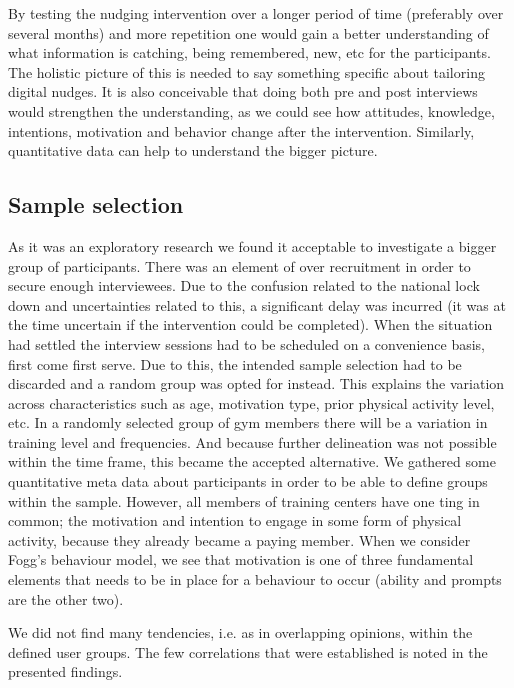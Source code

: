 By testing the nudging intervention over a longer period of time (preferably over several months) and more repetition one would gain a better understanding of what information is catching, being remembered, new, etc for the participants. The holistic picture of this is needed to say something specific about tailoring digital nudges. It is also conceivable that doing both pre and post interviews would strengthen the understanding, as we could see how attitudes, knowledge, intentions, motivation and behavior change after the intervention. Similarly, quantitative data can help to understand the bigger picture. 


\subsection{Sample selection}
As it was an exploratory research we found it acceptable to investigate a bigger group of participants. There was an element of over recruitment in order to secure enough interviewees. Due to the confusion related to the national lock down and uncertainties related to this, a significant delay was incurred (it was at the time uncertain if the intervention could be completed). When the situation had settled the interview sessions had to be scheduled on a convenience basis, first come first serve. Due to this, the intended sample selection had to be discarded and a random group was opted for instead. This explains the variation across characteristics such as age, motivation type, prior physical activity level, etc. In a randomly selected group of gym members there will be a variation in training level and frequencies. And because further delineation was not possible within the time frame, this became the accepted alternative. We gathered some quantitative meta data about participants in order to be able to define groups within the sample. However, all members of training centers have one ting in common; the motivation and intention to engage in some form of physical activity, because they already became a paying member. When we consider Fogg's behaviour model, we see that motivation is one of three fundamental elements that needs to be in place for a behaviour to occur (ability and prompts are the other two). 

We did not find many tendencies, i.e. as in overlapping opinions, within the defined user groups. The few correlations that were established is noted in the presented findings. 


